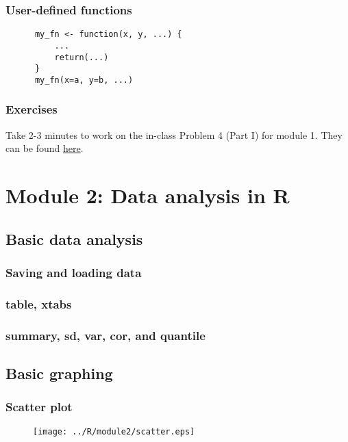 \documentclass{beamer}
\begin{document}
\begin{frame}[fragile]
    \frametitle{User-defined functions}
    \begin{verbatim}
      my_fn <- function(x, y, ...) {
          ...
          return(...)
      }
      my_fn(x=a, y=b, ...)
    \end{verbatim}
\end{frame}


\begin{frame}
    \frametitle{Exercises}
    Take 2-3 minutes to work on the in-class Problem 4 (Part I) for module 1.
    They can be found \href{https://github.com/rnitulescu/RcourseOncology2021/blob/master/exercises1.R}{here}.
\end{frame}




\section{Module 2: Data analysis in R}

\subsection{Basic data analysis}

\begin{frame}[fragile]
    \frametitle{Saving and loading data}
    \fontsize{9}{11}\selectfont
    
\end{frame}


\begin{frame}[fragile]
    \frametitle{table, xtabs}
    
\end{frame}


\begin{frame}[fragile]
    \frametitle{summary, sd, var, cor, and quantile}
    
\end{frame}


\subsection{Basic graphing}

\begin{frame}[fragile]
    \frametitle{Scatter plot}
    \fontsize{9}{11}\selectfont
    \begin{figure}[b]
      \centering
      \texttt{[image: ../R/module2/scatter.eps]}
    \end{figure}
\end{frame}
\end{document}
